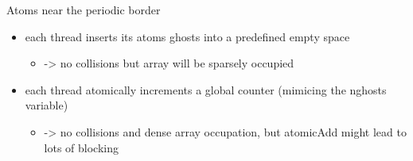 \documentclass[ignorenonframetext,]{beamer}
\providecommand{\tightlist}{%
  \setlength{\itemsep}{0pt}\setlength{\parskip}{0pt}}
\begin{document}
\begin{frame}[fragile]
\begin{block}{Atoms near the periodic border}
\begin{itemize}
\tightlist
\item
  each thread inserts its atoms ghosts into a predefined empty space

  \begin{itemize}
  \tightlist
  \item
    -\textgreater{} no collisions but array will be sparsely occupied
  \end{itemize}
\item
  each thread atomically increments a global counter (mimicing the
  nghosts variable)

  \begin{itemize}
  \tightlist
  \item
    -\textgreater{} no collisions and dense array occupation, but
    atomicAdd might lead to lots of blocking
  \end{itemize}
\end{itemize}

\end{block}

\end{frame}
\end{document}
